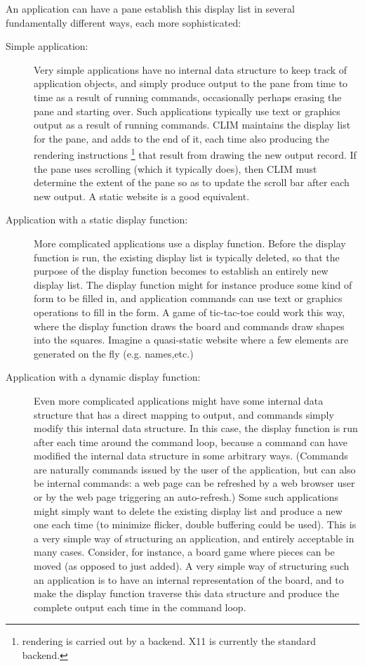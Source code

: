 An application can have a pane establish this display list in several
fundamentally different ways, each more sophisticated:

\begin{description}
  \item[Simple application:] Very simple applications have no internal
    data structure to keep track of application objects, and simply
    produce output to the pane from time to time as a result of
    running commands, occasionally perhaps erasing the pane and
    starting over.  Such applications typically use text or graphics
    output as a result of running commands.  CLIM maintains the
    display list for the pane, and adds to the end of it, each time
    also producing the rendering instructions \footnote{rendering is
      carried out by a backend. X11 is currently the standard
      backend.} that result from drawing the new output record.  If
    the pane uses scrolling (which it typically does), then CLIM must
    determine the extent of the pane so as to update the scroll bar
    after each new output. A static website is a good equivalent.

  \item[Application with a static display function:] More complicated
    applications use a display function.  Before the display function
    is run, the existing display list is typically deleted, so that
    the purpose of the display function becomes to establish an
    entirely new display list.  The display function might for
    instance produce some kind of form to be filled in, and
    application commands can use text or graphics operations to fill
    in the form.  A game of tic-tac-toe could work this way, where the
    display function draws the board and commands draw shapes into the
    squares. Imagine a quasi-static website where a few elements are
    generated on the fly (e.g. names,etc.)
 
  \item[Application with a dynamic display function:] Even more
    complicated applications might have some internal data structure
    that has a direct mapping to output, and commands simply modify
    this internal data structure.  In this case, the display function
    is run after each time around the command loop, because a command
    can have modified the internal data structure in some arbitrary
    ways.  (Commands are naturally commands issued by the user of the
    application, but can also be internal commands: a web page can be
    refreshed by a web browser user or by the web page triggering an
    auto-refresh.) Some such applications might simply want to delete
    the existing display list and produce a new one each time (to
    minimize flicker, double buffering could be used).  This is a very
    simple way of structuring an application, and entirely acceptable
    in many cases.  Consider, for instance, a board game where pieces
    can be moved (as opposed to just added).  A very simple way of
    structuring such an application is to have an internal
    representation of the board, and to make the display function
    traverse this data structure and produce the complete output each
    time in the command loop.


\end{description}
